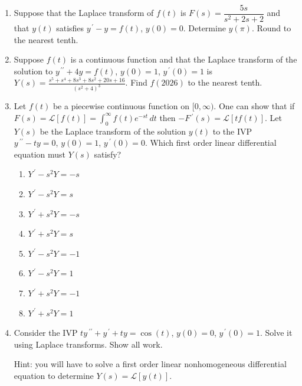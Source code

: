 \documentclass{ximera}
\newcommand{\Laplace}[1]{\ensuremath{\mathcal{L}{\left[#1\right]}}}
\begin{document}
\begin{enumerate}[label=(\arabic*)]




\item Suppose that the Laplace transform of $f(t)$ is $F(s)=\dfrac{5s}{s^2+2s+2}$ and that $y(t)$ satisfies $y^{\,\prime}-y=f(t)$, $y(0)=0$.  Determine $y(\pi)$.  Round to the nearest tenth.





\item Suppose $f(t)$ is a continuous function and that the Laplace transform of the solution to $y^{\,\prime\prime}+4y=f(t)$, $y(0)=1$, $y^{\,\prime}(0)=1$ is\\  $\displaystyle Y(s)=\frac{s^5+s^4+8s^3+8s^2+20s+16}{(s^2+4)^3}$.  Find $f(2026)$ to the nearest tenth.






\newpage

\item Let $f(t)$ be a piecewise continuous function on $[0,\infty)$.  One can show that if $F(s)=\mathcal{L}[f(t)]=\displaystyle \int_0^{\infty} f(t)e^{-st}\,dt$ then $-F\,^{\prime}(s)=\mathcal{L}[tf(t)]$.  Let $Y(s)$ be the Laplace transform of the solution $y(t)$ to the IVP \\$y\,^{\prime\prime}-ty=0$, $y(0)=1$, $y\,^{\prime}(0)=0$.   Which first order linear differential equation must $Y(s)$ satisfy? 

\begin{enumerate}[label=(\alph*)]
   \item $Y^{\,\prime}-s^2Y=-s$
   \item $Y^{\,\prime}-s^2Y=s$
   \item $Y^{\,\prime}+s^2Y=-s$
   \item $Y^{\,\prime}+s^2Y=s$ %
   \item $Y^{\,\prime}-s^2Y=-1$
   \item $Y^{\,\prime}-s^2Y=1$
   \item $Y^{\,\prime}+s^2Y=-1$
   \item $Y^{\,\prime}+s^2Y=1$ 
\end{enumerate}



\item Consider the IVP $ty\,^{\prime\prime}+y^{\,\prime}+ty=\cos(t)$, $y(0)=0$, $y^{\,\prime}(0)=1$.  Solve it using Laplace transforms.  Show all work.

Hint: you will have to solve a first order linear nonhomogeneous differential equation to determine $Y(s)=\Laplace{y(t)}$.

    

\end{enumerate}
\end{document}
